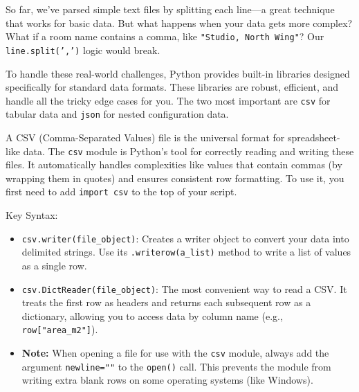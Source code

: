 
So far, we've parsed simple text files by splitting each line—a great technique that works for basic data. But what happens when your data gets more complex? What if a room name contains a comma, like \texttt{"Studio, North Wing"}? Our \texttt{line.split(',')} logic would break.

To handle these real-world challenges, Python provides built-in libraries designed specifically for standard data formats. These libraries are robust, efficient, and handle all the tricky edge cases for you. The two most important are \texttt{csv} for tabular data and \texttt{json} for nested configuration data.

A CSV (Comma-Separated Values) file is the universal format for spreadsheet-like data. The \texttt{csv} module is Python's tool for correctly reading and writing these files. It automatically handles complexities like values that contain commas (by wrapping them in quotes) and ensures consistent row formatting. To use it, you first need to add \texttt{import csv} to the top of your script.

{Key Syntax:}
\begin{itemize}
    \item \texttt{csv.writer(file\_object)}: Creates a writer object to convert your data into delimited strings. Use its \texttt{.writerow(a\_list)} method to write a list of values as a single row.
    \item \texttt{csv.DictReader(file\_object)}: The most convenient way to read a CSV. It treats the first row as headers and returns each subsequent row as a dictionary, allowing you to access data by column name (e.g., \texttt{row["area\_m2"]}).
    \item \textbf{Note:} When opening a file for use with the \texttt{csv} module, always add the argument \texttt{newline=""} to the \texttt{open()} call. This prevents the module from writing extra blank rows on some operating systems (like Windows).
\end{itemize}

